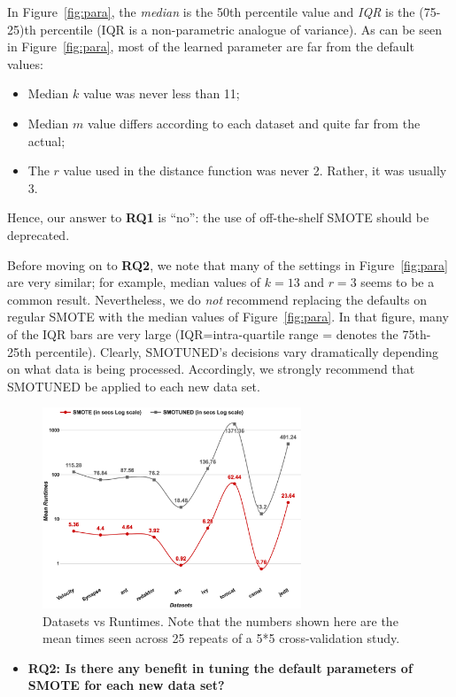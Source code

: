 \documentclass[sigconf,review, anonymous]{acmart}
\newcommand{\bi}{\begin{itemize}[leftmargin=0.4cm]}
\newcommand{\ei}{\end{itemize}}
\theoremstyle{break}
\theoremstyle{break}
\newcommand{\sma}{{\sc SMOTE}}
\newcommand{\smb}{{\sc SMOTUNED}}
\begin{document}
 
 In  Figure~\ref{fig:para}, the {\em median} is the 50th percentile
 value and {\em IQR} is the (75-25)th percentile
 (IQR is a non-parametric analogue of variance).
 As can be seen in Figure~\ref{fig:para}, most of the learned parameter are far from the default values:
 \bi
 \item 
 Median $k$ value was never less than 11;
 \item
 Median $m$ value differs according to each dataset and quite far from the actual;
 \item
 The $r$ value used in the distance function was never 2. Rather, it was usually 3.
 \ei
 Hence,  our answer to {\bf RQ1} is ``no'': the use of off-the-shelf {\sma} should be deprecated. 
 
 Before moving on to {\bf RQ2}, we note that many of the settings in Figure~\ref{fig:para} are very similar; for example, median values of $k=13$ and $r=3$ seems to be a common
result.  Nevertheless, we do {\em not} recommend replacing
the defaults on regular {\sma} with the median values
of Figure~\ref{fig:para}. In that figure, many of the  IQR bars are
very large (IQR=intra-quartile range = denotes the
75th-25th percentile). Clearly, SMOTUNED's decisions vary dramatically
depending on what data  is being processed.  Accordingly,
we strongly recommend that {\smb} be applied to each new data set.

\begin{figure}[!t]
  \centering
\includegraphics[width=\linewidth,height=6cm,keepaspectratio]{./fig/runtimes.png}
  \caption{Datasets vs Runtimes. Note that the numbers
  shown here are the mean times seen across 25 repeats of a 5*5 cross-validation study.
  }
  \label{runtime}
\end{figure}

\bi
\item {\bf RQ2: Is there any benefit in tuning the default parameters of SMOTE for each new data set?}
\ei
\end{document}
